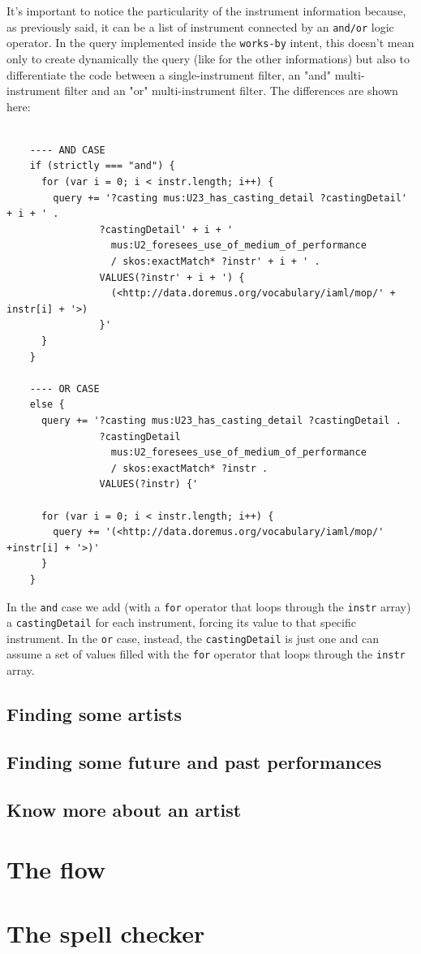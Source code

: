 \documentclass[a4paper,12pt]{report}
\begin{document}
	It's important to notice the particularity of the instrument information because, as previously said, it can be a list of instrument connected by an \texttt{and/or} logic operator. In the query implemented inside the \texttt{works-by} intent, this doesn't mean only to create dynamically the query (like for the other informations) but also to differentiate the code between a single-instrument filter, an "and" multi-instrument filter and an "or" multi-instrument filter. The differences are shown here:
	
	\begin{lstlisting}
	
	---- AND CASE
	if (strictly === "and") {
	  for (var i = 0; i < instr.length; i++) {
	    query += '?casting mus:U23_has_casting_detail ?castingDetail' + i + ' .
	            ?castingDetail' + i + '
	              mus:U2_foresees_use_of_medium_of_performance
	              / skos:exactMatch* ?instr' + i + ' .
	            VALUES(?instr' + i + ') {
	              (<http://data.doremus.org/vocabulary/iaml/mop/' + instr[i] + '>)
	            }'
	  }
	}
	
	---- OR CASE
	else {
	  query += '?casting mus:U23_has_casting_detail ?castingDetail .
	            ?castingDetail
	              mus:U2_foresees_use_of_medium_of_performance
	              / skos:exactMatch* ?instr .
	            VALUES(?instr) {'
	
	  for (var i = 0; i < instr.length; i++) {
	    query += '(<http://data.doremus.org/vocabulary/iaml/mop/' +instr[i] + '>)'
	  }
	}
	\end{lstlisting}
	In the \texttt{and} case we add (with a \texttt{for} operator that loops through the \texttt{instr} array) a \texttt{castingDetail} for each instrument, forcing its value to that specific instrument. In the \texttt{or} case, instead, the \texttt{castingDetail} is just one and can assume a set of values filled with the \texttt{for} operator that loops through the \texttt{instr} array. 
	
	\subsection{Finding some artists}
	
	\subsection{Finding some future and past performances}
	\subsection{Know more about an artist}
	
	\section{The flow}
	\section{The spell checker}
	
\end{document}
